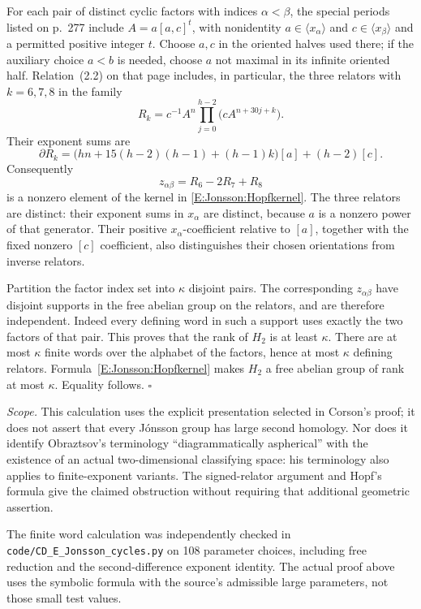 For each pair of distinct cyclic factors with indices $\alpha<\beta$,
the special periods listed on p.~277 include
$A=a[a,c]^t$, with nonidentity $a\in\langle x_\alpha\rangle$ and
$c\in\langle x_\beta\rangle$ and a permitted positive integer $t$.
Choose $a,c$ in the oriented halves used there; if the auxiliary
choice $a<b$ is needed, choose $a$ not maximal in its infinite
oriented half. Relation~(2.2) on that page includes, in particular,
the three relators with $k=6,7,8$ in the family
\[
 R_k=c^{-1}A^n
       \prod_{j=0}^{h-2}\bigl(c A^{n+30j+k}\bigr).
\]
Their exponent sums are
\[
 \partial R_k
 =\bigl(hn+15(h-2)(h-1)+(h-1)k\bigr)[a]+(h-2)[c].
\]
Consequently
\[
                    z_{\alpha\beta}=R_6-2R_7+R_8
\]
is a nonzero element of the kernel in
\eqref{E:Jonsson:Hopfkernel}. The three relators are distinct:
their exponent sums in $x_\alpha$ are distinct, because $a$ is a
nonzero power of that generator. Their positive $x_\alpha$-coefficient
relative to $[a]$, together with the fixed nonzero $[c]$ coefficient,
also distinguishes their chosen orientations from inverse relators.

Partition the factor index set into $\kappa$ disjoint pairs.
The corresponding $z_{\alpha\beta}$ have disjoint supports in the
free abelian group on the relators, and are therefore independent.
Indeed every defining word in such a support uses exactly the
two factors of that pair. This proves that the rank of $H_2$ is
at least $\kappa$. There are at most $\kappa$ finite words over
the alphabet of the factors, hence at most $\kappa$ defining
relators. Formula~\eqref{E:Jonsson:Hopfkernel} makes $H_2$ a
free abelian group of rank at most $\kappa$. Equality follows.
\hfill$\square$

\emph{Scope.}
This calculation uses the explicit presentation selected in
Corson's proof; it does not assert that every J\'onsson group has
large second homology. Nor does it identify Obraztsov's terminology
``diagrammatically aspherical'' with the existence of an actual
two-dimensional classifying space: his terminology also applies
to finite-exponent variants. The signed-relator argument and
Hopf's formula give the claimed obstruction without requiring
that additional geometric assertion.

The finite word calculation was independently checked in
\texttt{code/CD\_E\_Jonsson\_cycles.py} on 108 parameter choices,
including free reduction and the second-difference exponent identity.
The actual proof above uses the symbolic formula with the source's
admissible large parameters, not those small test values.


